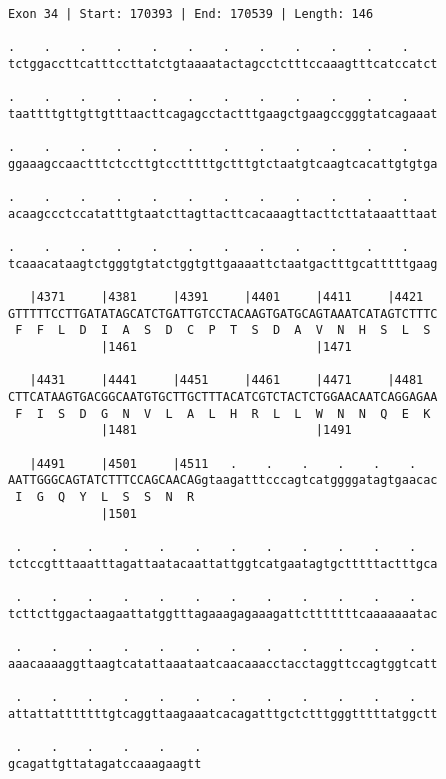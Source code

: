 \documentclass{article}
\begin{document}
\begin{Verbatim}
Exon 34 | Start: 170393 | End: 170539 | Length: 146
 
.    .    .    .    .    .    .    .    .    .    .    .    
tctggaccttcatttccttatctgtaaaatactagcctctttccaaagtttcatccatct
  
.    .    .    .    .    .    .    .    .    .    .    .    
taattttgttgttgtttaacttcagagcctactttgaagctgaagccgggtatcagaaat
  
.    .    .    .    .    .    .    .    .    .    .    .    
ggaaagccaactttctccttgtcctttttgctttgtctaatgtcaagtcacattgtgtga
  
.    .    .    .    .    .    .    .    .    .    .    .    
acaagccctccatatttgtaatcttagttacttcacaaagttacttcttataaatttaat
  
.    .    .    .    .    .    .    .    .    .    .    .    
tcaaacataagtctgggtgtatctggtgttgaaaattctaatgactttgcatttttgaag
  
   |4371     |4381     |4391     |4401     |4411     |4421  
GTTTTTCCTTGATATAGCATCTGATTGTCCTACAAGTGATGCAGTAAATCATAGTCTTTC
 F  F  L  D  I  A  S  D  C  P  T  S  D  A  V  N  H  S  L  S 
             |1461                         |1471            
  
   |4431     |4441     |4451     |4461     |4471     |4481  
CTTCATAAGTGACGGCAATGTGCTTGCTTTACATCGTCTACTCTGGAACAATCAGGAGAA
 F  I  S  D  G  N  V  L  A  L  H  R  L  L  W  N  N  Q  E  K 
             |1481                         |1491            
  
   |4491     |4501     |4511   .    .    .    .    .    .   
AATTGGGCAGTATCTTTCCAGCAACAGgtaagatttcccagtcatggggatagtgaacac
 I  G  Q  Y  L  S  S  N  R                                  
             |1501                                          
  
 .    .    .    .    .    .    .    .    .    .    .    .   
tctccgtttaaatttagattaatacaattattggtcatgaatagtgctttttactttgca
  
 .    .    .    .    .    .    .    .    .    .    .    .   
tcttcttggactaagaattatggtttagaaagagaaagattctttttttcaaaaaaatac
  
 .    .    .    .    .    .    .    .    .    .    .    .   
aaacaaaaggttaagtcatattaaataatcaacaaacctacctaggttccagtggtcatt
  
 .    .    .    .    .    .    .    .    .    .    .    .   
attattatttttttgtcaggttaagaaatcacagatttgctctttgggtttttatggctt
  
 .    .    .    .    .    .
gcagattgttatagatccaaagaagtt
\end{Verbatim}
\end{document}
